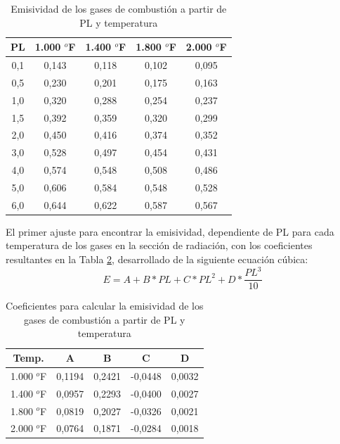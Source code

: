 \begin{table}[H]
\caption{Emisividad de los gases de combustión a partir de PL y temperatura}
\label{tbl:pl}
\centering
\begin{tabular}{c|c|c|c|c}
PL	& 1.000 $^o$F   & 1.400 $^o$F   & 1.800 $^o$F   & 2.000 $^o$F\\
\hline
0,1	& 0,143	        & 0,118	        & 0,102	        & 0,095\\
0,5	& 0,230	        & 0,201	        & 0,175	        & 0,163\\
1,0	& 0,320	        & 0,288	        & 0,254	        & 0,237\\
1,5	& 0,392	        & 0,359	        & 0,320         & 0,299\\
2,0	& 0,450	        & 0,416	        & 0,374	        & 0,352\\
3,0	& 0,528	        & 0,497	        & 0,454	        & 0,431\\
4,0	& 0,574	        & 0,548	        & 0,508	        & 0,486\\
5,0	& 0,606	        & 0,584	        & 0,548	        & 0,528\\
6,0	& 0,644	        & 0,622	        & 0,587	        & 0,567\\
\end{tabular}
\end{table}
\par El primer ajuste para encontrar la emisividad, dependiente de PL para cada temperatura de los gases en la sección de radiación, con los coeficientes resultantes en la Tabla \ref{tbl:emisividad}, desarrollado de la siguiente ecuación cúbica:
\begin{equation}
\label{eq:emisividad}
E = A + B*PL + C*PL^2 + D*\frac{PL^3}{10}
\end{equation}
\begin{table}[H]
\caption{Coeficientes para calcular la emisividad de los gases de combustión a partir de PL y temperatura}
\label{tbl:emisividad}
\centering
\begin{tabular}{c|c|c|c|c}		
Temp.	    & A	        & B	        & C 	    & D     \\
\hline
1.000 $^o$F	& 0,1194	& 0,2421	& -0,0448	& 0,0032\\
1.400 $^o$F	& 0,0957	& 0,2293	& -0,0400	& 0,0027\\
1.800 $^o$F	& 0,0819	& 0,2027	& -0,0326	& 0,0021\\
2.000 $^o$F	& 0,0764	& 0,1871	& -0,0284	& 0,0018\\
\end{tabular}
\end{table}

